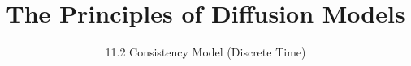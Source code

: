 
\title{The Principles of Diffusion Models}
\subtitle{11.2 Consistency Model (Discrete Time)}


\begin{frame}
    \titlepage
\end{frame}


